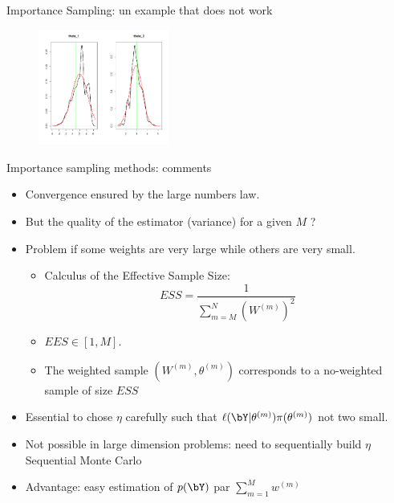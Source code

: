\begin{frame}{Importance Sampling: un example that does not work}
\begin{figure}
\begin{minipage}[c]{.46\linewidth}
   \end{minipage}
   \includegraphics[width=\textwidth,height=3.8cm]{figures/post_IS_vraie_2.png}
\end{figure}
\end{frame}



 \begin{frame}[allowframebreaks=0.8]{Importance sampling methods: comments}

\begin{itemize}
\item Convergence ensured by the large numbers law. 
\item But the quality of the estimator (variance) for a given $M$ ?   
\item  Problem if some weights are very large while others are very small. 
\begin{itemize}
\item Calculus of the \vert Effective Sample Size\noir: 
$$ ESS = \frac{1}{ \sum_{m=M}^N \left(W^{(m)}\right)^2 }$$
\item $EES \in [1,M]$. 
\item The weighted sample $(W^{(m)},  \theta^{(m)})$  corresponds to a no-weighted sample of size  $ESS$ 
\end{itemize}
\item Essential to chose  $\eta$ carefully such that   $\ell(\bY| \theta^{(m)}) \pi(\theta^{(m)})$ not two small. 
\item Not possible in large dimension problems: need to sequentially build $\eta$ \vert Sequential Monte Carlo \noir
\item \vert Advantage: \noir easy estimation of $p(\bY)$ par $\sum_{m=1}^M w^{(m)}$
\end{itemize}
\end{frame}


